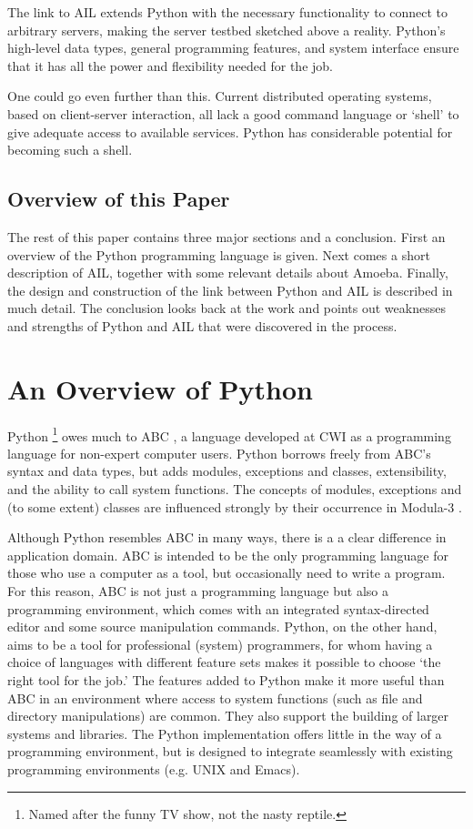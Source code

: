 The link to AIL extends Python with the necessary functionality to
connect to arbitrary servers, making the server testbed sketched above
a reality.  Python's high-level data types, general programming
features, and system interface ensure that it has all the power and
flexibility needed for the job.

One could go even further than this.  Current distributed operating
systems, based on client-server interaction, all lack a good command
language or `shell' to give adequate access to available services.
Python has considerable potential for becoming such a shell.

\subsection{Overview of this Paper}

The rest of this paper contains three major sections and a conclusion.
First an overview of the Python programming language is given.  Next
comes a short description of AIL, together with some relevant details
about Amoeba.  Finally, the design and construction of the link
between Python and AIL is described in much detail.  The conclusion
looks back at the work and points out weaknesses and strengths of
Python and AIL that were discovered in the process.

\section{An Overview of Python}

Python%
\footnote{
Named after the funny TV show, not the nasty reptile.
}
owes much to ABC
\cite{ABC},
a language developed at CWI as a programming language for non-expert
computer users.  Python borrows freely from ABC's syntax and data
types, but adds modules, exceptions and classes, extensibility, and
the ability to call system functions.  The concepts of modules,
exceptions and (to some extent) classes are influenced strongly by
their occurrence in Modula-3
\cite{Modula-3}.

Although Python resembles ABC in many ways, there is a a clear
difference in application domain.  ABC is intended to be the only
programming language for those who use a computer as a tool, but
occasionally need to write a program.  For this reason, ABC is not
just a programming language but also a programming environment, which
comes with an integrated syntax-directed editor and some source
manipulation commands.  Python, on the other hand, aims to be a tool
for professional (system) programmers, for whom having a choice of
languages with different feature sets makes it possible to choose `the
right tool for the job.'  The features added to Python make it more
useful than ABC in an environment where access to system functions
(such as file and directory manipulations) are common.  They also
support the building of larger systems and libraries.  The Python
implementation offers little in the way of a programming environment,
but is designed to integrate seamlessly with existing programming
environments (e.g. UNIX and Emacs).


